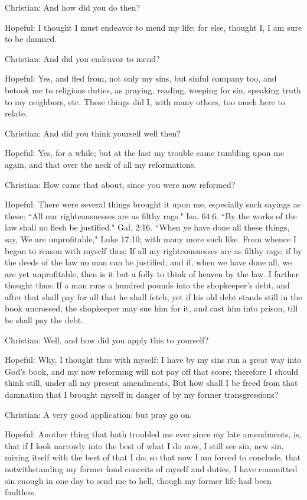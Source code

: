 Christian: And how did you do then?

Hopeful: I thought I must endeavor to mend my life; for else, thought I, I am sure to be damned.

Christian: And did you endeavor to mend?

Hopeful: Yes, and fled from, not only my sins, but sinful company too, and betook me to religious duties, as praying, reading, weeping for sin, speaking truth to my neighbors, etc. These things did I, with many others, too much here to relate.

Christian: And did you think yourself well then?

Hopeful: Yes, for a while; but at the last my trouble came tumbling upon me again, and that over the neck of all my reformations.

Christian: How came that about, since you were now reformed?

Hopeful: There were several things brought it upon me, especially such sayings as these: ``All our righteousnesses are as filthy rags." Isa. 64:6. ``By the works of the law shall no flesh be justified." Gal. 2:16. ``When ye have done all these things, say, We are unprofitable," Luke 17:10; with many more such like. From whence I began to reason with myself thus: If all my righteousnesses are as filthy rags; if by the deeds of the law no man can be justified; and if, when we have done all, we are yet unprofitable, then is it but a folly to think of heaven by the law. I farther thought thus: If a man runs a hundred pounds into the shopkeeper's debt, and after that shall pay for all that he shall fetch; yet if his old debt stands still in the book uncrossed, the shopkeeper may sue him for it, and cast him into prison, till he shall pay the debt.

Christian: Well, and how did you apply this to yourself?

Hopeful: Why, I thought thus with myself: I have by my sins run a great way into God's book, and my now reforming will not pay off that score; therefore I should think still, under all my present amendments, But how shall I be freed from that damnation that I brought myself in danger of by my former transgressions?

Christian: A very good application: but pray go on.

Hopeful: Another thing that hath troubled me ever since my late amendments, is, that if I look narrowly into the best of what I do now, I still see sin, new sin, mixing itself with the best of that I do; so that now I am forced to conclude, that notwithstanding my former fond conceits of myself and duties, I have committed sin enough in one day to send me to hell, though my former life had been faultless.

